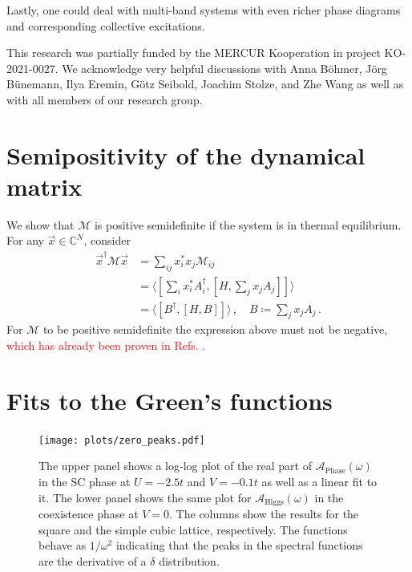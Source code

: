 \documentclass[
    reprint, 
    aps,
    preprintnumbers,
    twocolumn,
    prb,
    superscriptaddress
]{revtex4-2}
\newcommand{\mM}{\mathcal{M}}
\newcommand{\spectral}[1]{\mathcal{A}_\text{#1}  (\omega)}
\newcommand{\markEdited}{red}
\begin{document}
Lastly, one could deal with multi-band systems with even richer phase
diagrams and corresponding collective excitations. 


\begin{acknowledgments} 
	This research was partially funded by the MERCUR Kooperation
		in project KO-2021-0027. We acknowledge very helpful discussions with
		Anna B\"ohmer, J\"org B\"unemann, Ilya Eremin, G\"otz Seibold, Joachim Stolze, and Zhe Wang
		as well as with all members of our research group.
\end{acknowledgments}


\appendix
\section{Semipositivity of the dynamical matrix}
\label{sec:positive_M}

We show that $\mathcal{M}$ is positive semidefinite if the system is in thermal equilibrium.
For any $\vec{x} \in \mathbb{C}^N$, consider
\begin{align}
    \vec{x}^\dagger \mM \vec{x} &= \sum_{ij} x_i^* x_j \mM_{ij} \nonumber \\
        &= \langle \left[ \sum_i x_i^* A_i^\dagger, \left[ H, \sum_j x_j A_j \right] \right]  \rangle \nonumber \\
        &= \langle [B^\dagger, [H, B]] \rangle\,,\quad B \coloneqq  \sum_j x_j A_j\,.
\end{align}
For $\mM$ to be positive semidefinite the expression above must not be negative,
\textcolor{\markEdited}{which has already been proven in Refs. \cite{Dyson1978,mermin66}.}

\section{Fits to the Green's functions}
\label{sec:fit_greens_functions}

\begin{figure}
    \centering
    \texttt{[image: plots/zero\_peaks.pdf]}
    \caption{The upper panel shows a log-log plot of the real part of $\spectral{Phase}$ in the SC phase at $U=-2.5t$ and $V=-0.1t$ as well as a linear fit to it.
    The lower panel shows the same plot for $\spectral{Higgs}$ in the coexistence phase at $V=0$. The columns show the results for the square and the simple cubic lattice, respectively.
    The functions behave as $1/\omega^2$ indicating that the peaks in the spectral functions are the derivative of a $\delta$ distribution.}
    \label{fig:zero_peaks}
\end{figure}
\end{document}

